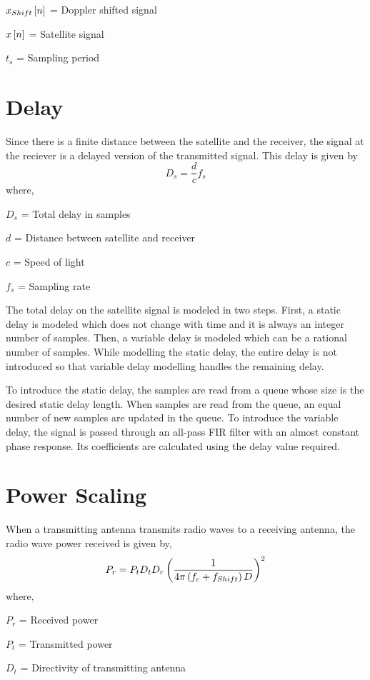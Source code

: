 \documentclass[11pt]{book}
\begin{document}
$x_{Shift}{}\left[n\right]$ = Doppler shifted signal

$x{}\left[n\right]$ = Satellite signal

$t_{s}$ = Sampling period

\section{Delay}
Since there is a finite distance between the satellite and the receiver, the signal at the reciever is a delayed version of the transmitted signal. This delay is given by
\begin{equation}
    D_{s} = \frac{d}{c}f_{s} 
\end{equation}
where,

$D_{s}$ = Total delay in samples

$d$ = Distance between satellite and receiver

$c$ = Speed of light

$f_{s}$ = Sampling rate

The total delay on the satellite signal is modeled in two steps. First, a static delay is modeled which does not change with time and it is always an integer number of samples. Then, %
a variable delay is modeled which can be a rational number of samples. While modelling the static delay, the entire delay is not introduced so that variable delay modelling handles the remaining %
delay.

To introduce the static delay, the samples are read from a queue whose size is the desired static delay length. When samples are read from the queue, an equal number of new samples are %
updated in the queue. To introduce the variable delay, the signal is passed through an all-pass FIR filter with an almost constant phase response. Its coefficients are calculated %
using the delay value required.

\section{Power Scaling}
When a transmitting antenna transmits radio waves to a receiving antenna, the radio wave power received is given by,
\begin{equation}
    P_r = P_t D_t D_r \left(\frac{1}{4 \pi \left(f_c + f_{Shift}\right) D}\right)^2
\end{equation}
where,

$P_r$ = Received power

$P_t$ = Transmitted power

$D_t$ = Directivity of transmitting antenna 
\end{document}
